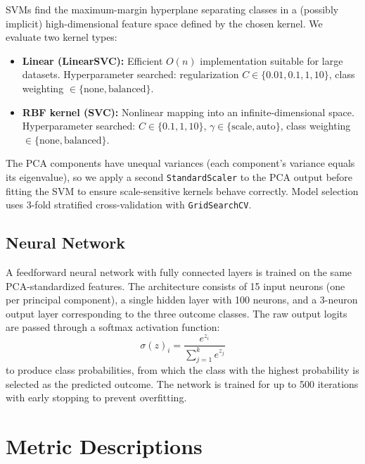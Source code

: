 \documentclass[conference]{IEEEtran}
\begin{document}
SVMs find the maximum-margin hyperplane separating classes in a (possibly implicit) high-dimensional feature space defined by the chosen kernel. We evaluate two kernel types:

\begin{itemize}
  \item \textbf{Linear (LinearSVC):} Efficient $O(n)$ implementation suitable for large datasets. Hyperparameter searched: regularization $C \in \{0.01, 0.1, 1, 10\}$, class weighting $\in \{\text{none}, \text{balanced}\}$.
  \item \textbf{RBF kernel (SVC):} \cite{RBF} Nonlinear mapping into an infinite-dimensional space. Hyperparameter searched: $C \in \{0.1, 1, 10\}$, $\gamma \in \{\text{scale}, \text{auto}\}$, class weighting $\in \{\text{none}, \text{balanced}\}$.
\end{itemize}

The PCA components have unequal variances (each component's variance equals its eigenvalue), so we apply a second \texttt{StandardScaler} to the PCA output before fitting the SVM to ensure scale-sensitive kernels behave correctly. Model selection uses 3-fold stratified cross-validation with \texttt{GridSearchCV}.

\subsection{Neural Network}

A feedforward neural network with fully connected layers is trained on the same PCA-standardized features. The architecture consists of 15 input neurons (one per principal component), a single hidden layer with 100 neurons, and a 3-neuron output layer corresponding to the three outcome classes. The raw output logits are passed through a softmax activation function:
\begin{equation}
  \sigma(z)_i = \frac{e^{z_i}}{\sum_{j=1}^{k} e^{z_j}}
\end{equation}
to produce class probabilities, from which the class with the highest probability is selected as the predicted outcome. The network is trained for up to 500 iterations with early stopping to prevent overfitting.

\section{Metric Descriptions}
\end{document}
